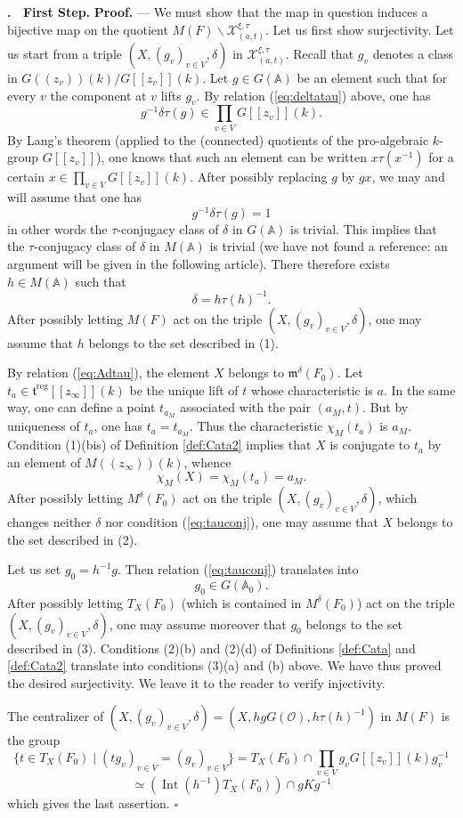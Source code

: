 \documentclass[12pt,a4paper,oneside,english,leqno]{smfart}
\newenvironment{paragr}[1][]{\refstepcounter{subsection}%
  \addcontentsline{toc}{subsection}{\protect\numberline{\thesubsection}#1}%
  \noindent \textbf{\thesubsection . \ #1}}{\medskip}
\newcounter{theo}
\numberwithin{theo}{subsection}
\newenvironment{preuve}[1][]{\noindent \textbf{Proof.} #1 --- }{\hfill
  \ensuremath{\square} \medskip}
\DeclareMathOperator{\reg}{reg}
\DeclareMathOperator{\Int}{Int}
\newcommand{\AAA}{\mathbb{A}}
\newcommand{\oc}{\mathcal{O}}
\newcommand{\xc}{\mathcal{X}}
\newcommand{\mgo}{\mathfrak{m}}
\newcommand{\tgo}{\mathfrak{t}}
\begin{document}
\begin{paragr}[First Step.]
\begin{preuve}
We must show that the map in question induces a bijective map on the quotient $M(F)\backslash\xc^{\xi,\tau}_{(a,t)}$. Let us first show surjectivity. Let us start from a triple $(X,(g_v)_{v\in V},\delta)$ in $\xc^{\xi,\tau}_{(a,t)}$. Recall that $g_v$ denotes a class in $G((z_v))(k)/G[[z_v]](k)$. Let $g\in G(\AAA)$ be an element such that for every $v$ the component at $v$ lifts $g_v$. By relation (\ref{eq:deltatau}) above, one has
$$g^{-1}\delta\tau(g)\in\prod_{v\in V}G[[z_v]](k).$$
By Lang's theorem (applied to the (connected) quotients of the pro-algebraic $k$-group $G[[z_v]]$), one knows that such an element can be written $x\tau(x^{-1})$ for a certain $x\in\prod_{v\in V}G[[z_v]](k)$. After possibly replacing $g$ by $gx$, we may and will assume that one has
\begin{equation}
\label{eq:tauconj}
g^{-1}\delta\tau(g)=1
\end{equation}
in other words the $\tau$-conjugacy class of $\delta$ in $G(\AAA)$ is trivial. This implies that the $\tau$-conjugacy class of $\delta$ in $M(\AAA)$ is trivial (we have not found a reference: an argument will be given in the following article). There therefore exists $h\in M(\AAA)$ such that
$$\delta=h\tau(h)^{-1}.$$
After possibly letting $M(F)$ act on the triple $(X,(g_v)_{v\in V},\delta)$, one may assume that $h$ belongs to the set described in (1).

By relation (\ref{eq:Adtau}), the element $X$ belongs to $\mgo^\delta(F_0)$. Let $t_a\in\tgo^{\reg}[[z_\infty]](k)$ be the unique lift of $t$ whose characteristic is $a$. In the same way, one can define a point $t_{a_M}$ associated with the pair $(a_M,t)$. But by uniqueness of $t_a$, one has $t_a=t_{a_M}$. Thus the characteristic $\chi_M(t_a)$ is $a_M$. Condition (1)(bis) of Definition \ref{def:Cata2} implies that $X$ is conjugate to $t_a$ by an element of $M((z_\infty))(k)$, whence
$$\chi_M(X)=\chi_M(t_a)=a_M.$$
After possibly letting $M^\delta(F_0)$ act on the triple $(X,(g_v)_{v\in V},\delta)$, which changes neither $\delta$ nor condition (\ref{eq:tauconj}), one may assume that $X$ belongs to the set described in (2).

Let us set $g_0=h^{-1}g$. Then relation (\ref{eq:tauconj}) translates into
$$g_0\in G(\AAA_0).$$
After possibly letting $T_X(F_0)$ (which is contained in $M^\delta(F_0)$) act on the triple $(X,(g_v)_{v\in V},\delta)$, one may assume moreover that $g_0$ belongs to the set described in (3). Conditions (2)(b) and (2)(d) of Definitions \ref{def:Cata} and \ref{def:Cata2} translate into conditions (3)(a) and (b) above. We have thus proved the desired surjectivity. We leave it to the reader to verify injectivity.

The centralizer of $(X,(g_v)_{v\in V},\delta)=(X,hgG(\oc),h\tau(h)^{-1})$ in $M(F)$ is the group
$$\{t\in T_X(F_0)\mid (tg_v)_{v\in V}=(g_v)_{v\in V}\}=T_X(F_0)\cap\prod_{v\in V}g_vG[[z_v]](k)g_v^{-1}$$
$$\simeq(\Int(h^{-1})T_X(F_0))\cap gKg^{-1}$$
which gives the last assertion.
\end{preuve}
\end{paragr}
\end{document}
